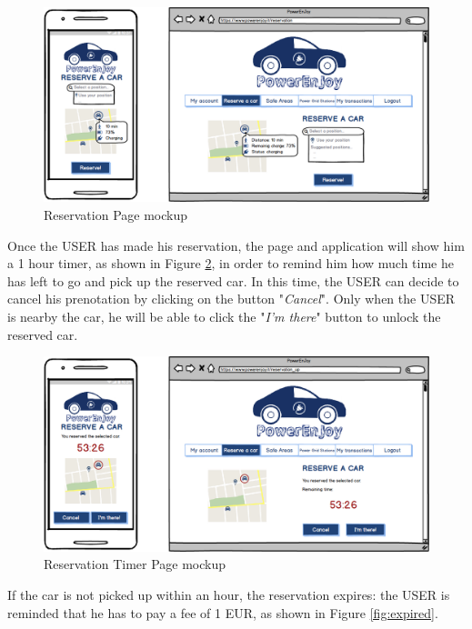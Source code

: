 \vspace{80pt}

\begin{figure}[htbp]
\centering
\includegraphics[width=\textwidth]{Images/Mockups/Reservation}
\caption{Reservation Page mockup}
\label{fig:reservation}
\end{figure}
\clearpage

Once the USER has made his reservation, the page and application will show him a 1 hour timer, as shown in Figure \ref{fig:timer}, in order to remind him how much time he has left to go and pick up the reserved car. In this time, the USER can decide to cancel his prenotation by clicking on the button "\textit{Cancel}". Only when the USER is nearby the car, he will be able to click the "\textit{I'm there}" button to unlock the reserved car.

\vspace{80pt}

\begin{figure}[htbp]
\centering
\includegraphics[width=\textwidth]{Images/Mockups/Timer}
\caption{Reservation Timer Page mockup}
\label{fig:timer}
\end{figure}
\clearpage

If the car is not picked up within an hour, the reservation expires: the USER is reminded that he has to pay a fee of 1 EUR, as shown in Figure \ref{fig:expired}.

